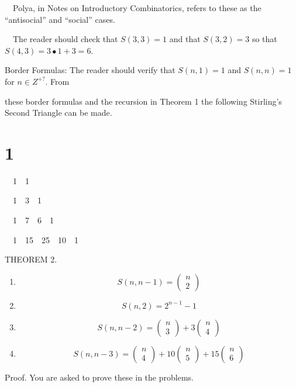 \documentclass{article}
\begin{document}
\ \ Polya, in Notes on Introductory Combinatorics, refers to these as the “antisocial” and “social” cases. 

\ \ The reader should check that  $S\left(3,3\right)=1$ and that  $S\left(3,2\right)=3$ so that 
$S\left(4,3\right)=3{\bullet}1+3=6$.

Border Formulas: The reader should verify that  $S\left(n,1\right)=1$ and  $S\left(n,n\right)=1$ for  $n{\in}Z^{+?}$.
From 

these border formulas and the recursion in Theorem 1 the following Stirling’s Second Triangle can be made. 

\section[1]{1}
\ \ 1\ \ 1

\ \ 1\ \ 3\ \ 1

\ \ 1\ \ 7\ \ 6\ \ 1

\ \ 1\ \ 15\ \ 25\ \ 10\ \ 1

THEOREM 2.

\begin{enumerate}
\item \begin{equation*}
S\left(n,n-1\right)=\left(\begin{matrix}n\\2\end{matrix}\right)
\end{equation*}
\item \begin{equation*}
S\left(n,2\right)=2^{n-1}-1
\end{equation*}
\item \begin{equation*}
S\left(n,n-2\right)=\left(\begin{matrix}n\\3\end{matrix}\right)+3\left(\begin{matrix}n\\4\end{matrix}\right)
\end{equation*}
\item \begin{equation*}
S\left(n,n-3\right)=\left(\begin{matrix}n\\4\end{matrix}\right)+10\left(\begin{matrix}n\\5\end{matrix}\right)+15\left(\begin{matrix}n\\6\end{matrix}\right)
\end{equation*}
\end{enumerate}
Proof. You are asked to prove these in the problems. 
\end{document}
